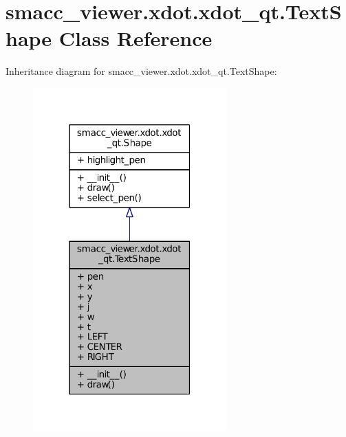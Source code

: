 \hypertarget{classsmacc__viewer_1_1xdot_1_1xdot__qt_1_1TextShape}{}\section{smacc\+\_\+viewer.\+xdot.\+xdot\+\_\+qt.\+Text\+Shape Class Reference}
\label{classsmacc__viewer_1_1xdot_1_1xdot__qt_1_1TextShape}


Inheritance diagram for smacc\+\_\+viewer.\+xdot.\+xdot\+\_\+qt.\+Text\+Shape\+:
\nopagebreak
\begin{figure}[H]
\begin{center}
\leavevmode
\includegraphics[width=211pt]{classsmacc__viewer_1_1xdot_1_1xdot__qt_1_1TextShape__inherit__graph}
\end{center}
\end{figure}


